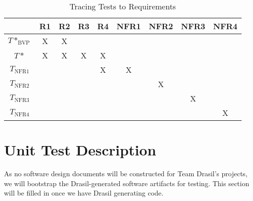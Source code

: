 \documentclass[12pt, titlepage]{article}
\begin{document}
\begin{longtable}{|c|c|c|c|c|c|c|c|c|}
    \caption{Tracing Tests to Requirements}
    \label{tab:trace_tests_to_reqs} \\
    
    \hline

                    & R1 & R2 & R3 & R4 & NFR1 & NFR2 & NFR3 & NFR4 \\ \hline
    $T*_\text{BVP}$ & X  & X  &    &    &      &      &      &      \\ \hline
    $T*$            & X  & X  & X  & X  &      &      &      &      \\ \hline
    $T_\text{NFR1}$ &    &    &    & X  & X    &      &      &      \\ \hline
    $T_\text{NFR2}$ &    &    &    &    &      & X    &      &      \\ \hline
    $T_\text{NFR3}$ &    &    &    &    &      &      & X    &      \\ \hline
    $T_\text{NFR4}$ &    &    &    &    &      &      &      & X    \\ \hline

\end{longtable}

\newpage{}

\section{Unit Test Description}
\label{sec:unit_test_description}

As no software design documents will be constructed for Team Drasil's projects,
we will bootstrap the Drasil-generated software artifacts for testing. This
section will be filled in once we have Drasil generating code.


\newpage{}

\printbibliography{}


\newpage{}
\end{document}
